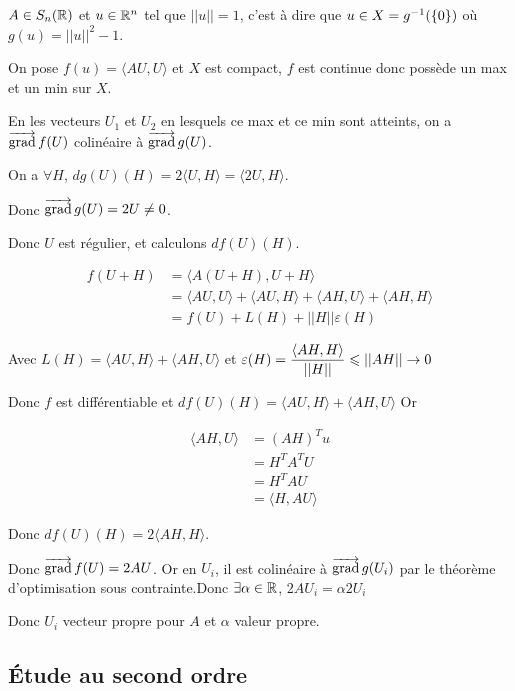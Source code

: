 \begin{exemple}
    $A \in S_n(\mathbb{R})$ et $u \in \mathbb{R}^n$ tel que $||u|| = 1$, c'est à dire que $u \in X = g^{-1} (\{0\})$ où 
    $g(u) = ||u||^2 - 1$.

    On pose $f(u) = \langle AU , U \rangle$ et $X$ est compact, $f$ est continue donc possède un max 
    et un min sur $X$. 

    En les vecteurs $U_1$ et $U_2$ en lesquels ce max et ce min sont atteints, on a 
    $\overrightarrow{\operatorname{grad}} \, f(U)$ colinéaire à $\overrightarrow{\operatorname{grad}} \, g(U)$. 

    On a $\forall H$, $dg(U)(H) = 2 \langle U , H \rangle = \langle 2 U , H \rangle$.

    Donc $\overrightarrow{\operatorname{grad}} \, g (U) = 2 U \neq 0$. 

    Donc $U$ est régulier, et calculons $df(U)(H)$. 

    \begin{align}
        f(U + H) & = \langle A(U + H), U + H \rangle \\
        & = \langle AU, U \rangle + \langle AU, H \rangle + \langle AH, U \rangle + \langle AH, H \rangle \\
        & = f(U) + L(H) + ||H|| \varepsilon(H)
    \end{align}

    Avec $L(H) = \langle AU, H \rangle + \langle AH, U \rangle$ et $\varepsilon(H) = \displaystyle \frac{\langle AH, H \rangle }{ || H||} \leqslant ||AH|| \to 0$

    Donc $f$ est différentiable et $df(U)(H) = \langle AU, H \rangle + \langle AH, U \rangle$
    Or 

    \begin{align}
        \langle AH, U \rangle & = (AH)^T u \\
        & = H^T A^T U \\
        & = H^T AU \\
        & = \langle H, AU \rangle 
    \end{align}

    Donc $df(U)(H) = 2 \langle AH, H \rangle$. 

    Donc $\overrightarrow{\operatorname{grad}} \, f (U) = 2 AU$. Or en $U_i$, il est colinéaire à $\overrightarrow{\operatorname{grad}} \, g (U_i)$ par 
    le théorème d'optimisation sous contrainte.Donc $\exists \alpha \in \mathbb{R}$, $2AU_i =  \alpha 2 U_i$

    Donc $U_i$ vecteur propre pour $A$ et $\alpha$ valeur propre. 
\end{exemple}


\subsection{\'Etude au second ordre}

